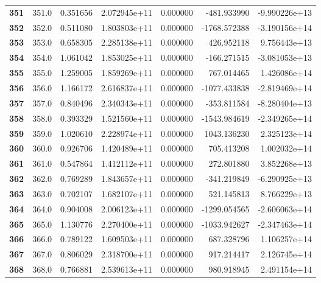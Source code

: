\documentclass{report}[12pt]
\begin{document}
\begin{center}
\begin{tabular}{lrrrrrr}
\textbf{351 } &          351.0 &   0.351656 &  2.072945e+11 &    0.000000 &  -481.933990 & -9.990226e+13 \\
\textbf{352 } &          352.0 &   0.511080 &  1.803803e+11 &    0.000000 & -1768.572388 & -3.190156e+14 \\
\textbf{353 } &          353.0 &   0.658305 &  2.285138e+11 &    0.000000 &   426.952118 &  9.756443e+13 \\
\textbf{354 } &          354.0 &   1.061042 &  1.853025e+11 &    0.000000 &  -166.271515 & -3.081053e+13 \\
\textbf{355 } &          355.0 &   1.259005 &  1.859269e+11 &    0.000000 &   767.014465 &  1.426086e+14 \\
\textbf{356 } &          356.0 &   1.166172 &  2.616837e+11 &    0.000000 & -1077.433838 & -2.819469e+14 \\
\textbf{357 } &          357.0 &   0.840496 &  2.340343e+11 &    0.000000 &  -353.811584 & -8.280404e+13 \\
\textbf{358 } &          358.0 &   0.393329 &  1.521560e+11 &    0.000000 & -1543.984619 & -2.349265e+14 \\
\textbf{359 } &          359.0 &   1.020610 &  2.228974e+11 &    0.000000 &  1043.136230 &  2.325123e+14 \\
\textbf{360 } &          360.0 &   0.926706 &  1.420489e+11 &    0.000000 &   705.413208 &  1.002032e+14 \\
\textbf{361 } &          361.0 &   0.547864 &  1.412112e+11 &    0.000000 &   272.801880 &  3.852268e+13 \\
\textbf{362 } &          362.0 &   0.769289 &  1.843657e+11 &    0.000000 &  -341.219849 & -6.290925e+13 \\
\textbf{363 } &          363.0 &   0.702107 &  1.682107e+11 &    0.000000 &   521.145813 &  8.766229e+13 \\
\textbf{364 } &          364.0 &   0.904008 &  2.006123e+11 &    0.000000 & -1299.054565 & -2.606063e+14 \\
\textbf{365 } &          365.0 &   1.130776 &  2.270400e+11 &    0.000000 & -1033.942627 & -2.347463e+14 \\
\textbf{366 } &          366.0 &   0.789122 &  1.609503e+11 &    0.000000 &   687.328796 &  1.106257e+14 \\
\textbf{367 } &          367.0 &   0.806029 &  2.318700e+11 &    0.000000 &   917.214417 &  2.126745e+14 \\
\textbf{368 } &          368.0 &   0.766881 &  2.539613e+11 &    0.000000 &   980.918945 &  2.491154e+14 \\

\end{tabular}
\end{center}
\end{document}
